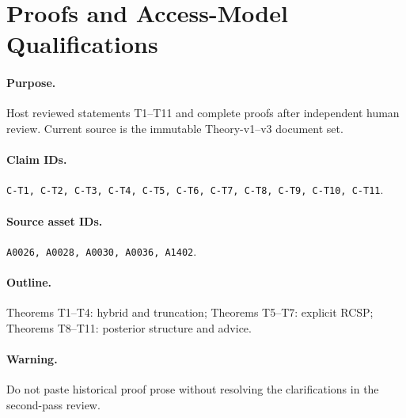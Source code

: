 \section{Proofs and Access-Model Qualifications}

\paragraph{Purpose.}
Host reviewed statements T1--T11 and complete proofs after independent human
review. Current source is the immutable Theory-v1--v3 document set.

\paragraph{Claim IDs.}
\texttt{C-T1, C-T2, C-T3, C-T4, C-T5, C-T6, C-T7, C-T8, C-T9, C-T10, C-T11}.

\paragraph{Source asset IDs.}
\texttt{A0026, A0028, A0030, A0036, A1402}.

\paragraph{Outline.}
Theorems T1--T4: hybrid and truncation; Theorems T5--T7: explicit RCSP;
Theorems T8--T11: posterior structure and advice.

\paragraph{Warning.}
Do not paste historical proof prose without resolving the clarifications in the
second-pass review.

